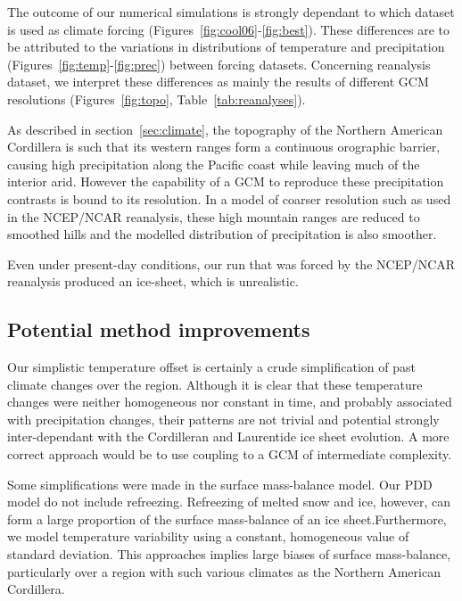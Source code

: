 The outcome of our numerical simulations is strongly dependant to which dataset is used as climate forcing (Figures~\ref{fig:cool06}-\ref{fig:best}). These differences are to be attributed to the variations in distributions of temperature and precipitation (Figures~\ref{fig:temp}-\ref{fig:prec}) between forcing datasets. Concerning reanalysis dataset, we interpret these differences as mainly the results of different GCM resolutions (Figures~\ref{fig:topo}, Table~\ref{tab:reanalyses}).

As described in section~\ref{sec:climate}, the topography of the Northern American Cordillera is such that its western ranges form a continuous orographic barrier, causing high precipitation along the Pacific coast while leaving much of the interior arid. However the capability of a GCM to reproduce these precipitation contrasts is bound to its resolution. In a model of coarser resolution such as used in the NCEP/NCAR reanalysis, these high mountain ranges are reduced to smoothed hills and the modelled distribution of precipitation is also smoother.

Even under present-day conditions, our run that was forced by the NCEP/NCAR reanalysis produced an ice-sheet, which is unrealistic.

\subsection{Potential method improvements}

Our simplistic temperature offset is certainly a crude simplification of past climate changes over the region. Although it is clear that these temperature changes were neither homogeneous nor constant in time, and probably associated with precipitation changes, their patterns are not trivial and potential strongly inter-dependant with the Cordilleran and Laurentide ice sheet evolution. A more correct approach would be to use coupling to a GCM of intermediate complexity.

Some simplifications were made in the surface mass-balance model. Our PDD model do not include refreezing. Refreezing of melted snow and ice, however, can form a large proportion of the surface mass-balance of an ice sheet.\needref Furthermore, we model temperature variability using a constant, homogeneous value of standard deviation. This approaches implies large biases of surface mass-balance\needref, particularly over a region with such various climates as the Northern American Cordillera.

